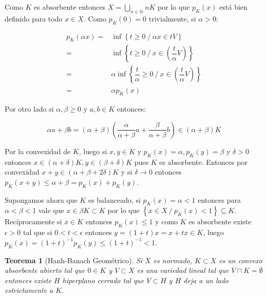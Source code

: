 \documentclass[11pt]{article}
\newcommand{\N}{{\mathbb{N}}}
\newcommand{\sett}[1]{\left\lbrace#1\right\rbrace}
\newcommand{\Bigcup}[2]{\bigcup\limits_{#1}{#2}}
\newtheorem{theorem}{Teorema}
\numberwithin{theorem}{subsection}
\newenvironment{proof}[1][Demostraci\'on]{\begin{trivlist}
		\item[\hskip \labelsep {\bfseries #1}]}{\end{trivlist}}
\newcommand{\qed}{\nobreak \ifvmode \relax \else
	\ifdim\lastskip<1.5em \hskip-\lastskip
	\hskip1.5em plus0em minus0.5em \fi \nobreak
	\vrule height0.75em width0.5em depth0.25em\fi}
\begin{document}
\begin{proof}
	Como $K$ es absorbente entonces $X = \Bigcup{n \in \N}{nK}$ por lo que $p_K(x)$ est\'a bien definido para todo $x \in X$. Como $p_K(0) = 0$ trivialmente, si $\alpha > 0$:
	
	\begin{equation*}
	\begin{aligned}
		p_K(\alpha x) = & \inf \sett{t \geq 0 \ / \ \alpha x \in tV} \\
					  = & \inf \sett{t \geq 0 \ / \ x \in  \left(\dfrac{t}{\alpha}V \right)} \\
					  = & \alpha \inf \sett{\dfrac{t}{\alpha} \geq 0 \ / \ x \in  \left(\dfrac{t}{\alpha}V \right)} \\
					  = & \alpha p_K(x)
	\end{aligned}
	\end{equation*}
	
	Por otro lado si $\alpha, \beta \geq 0$ y $a,b \in K$ entonces:
	
	\begin{equation*}
		\alpha a + \beta b = \left(\alpha + \beta\right) \left(\dfrac{\alpha}{\alpha + \beta} a + \dfrac{\beta}{\alpha + \beta} b\right) \in \left(\alpha + \beta\right) K
	\end{equation*}	
	
	Por la convexidad de $K$, luego si $x,y \in K$ y $p_K(x) = \alpha, p_K(y) = \beta$ y $\delta > 0$ entonces $x \in \left(\alpha + \delta\right)K, y \in \left(\beta + \delta\right)K$ pues $K$ es absorbente. Entonces por convexidad $x+y \in \left(\alpha + \beta + 2 \delta\right)K$ y si $\delta \rightarrow 0$ entonces $p_K(x+y) \leq \alpha + \beta = p_K(x) + p_K(y)$.
	
	Supongamos ahora que $K$ es balanceado, si $p_K(x) = \alpha < 1$ entonces para $\alpha < \beta < 1$ vale que $x \in \beta K \subset K$ por lo que $\sett{x \in X \ / \ p_K(x) < 1} \subseteq K$. Rec\'iprocamente si $x \in K$ entonces $p_K(x) \leq 1$ y como $K$ es absorbente existe $\epsilon > 0$ tal que si $0 < t < \epsilon$ entonces $y = (1+t)x = x + tx \in K$, luego $p_K(x) = (1+t)^{-1}p_K(y) \leq (1+t)^{-1} < 1$. \qed
	
\end{proof}

\begin{theorem}[Hanh-Banach Geom\'etrico]
	\label{Hanh-Banach geometrico}
	Si $X$ es normado, $K \subset X$ es un convexo absorbente abierto tal que $0 \in K$ y $V \subset X$ es una variedad lineal tal que $V \cap K = \emptyset$ entonces existe $H$ hiperplano cerrado tal que $V \subset H$ y $H$ deja a un lado estrictamente a $K$.
\end{theorem}
\end{document}
